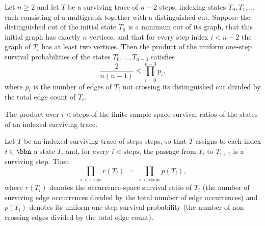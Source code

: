 \begin{theorem}
\label{KargerTrace.survivingTrace_uniform_survival_product_lower_bound}
\leanok
{}
Let $n \ge 2$ and let $T$ be a surviving trace of $n-2$ steps, indexing states $T_0,
T_1, \ldots$ each consisting of a multigraph together with a distinguished cut. Suppose
the distinguished cut of the initial state $T_0$ is a minimum cut of its graph, that
this initial graph has exactly $n$ vertices, and that for every step index $i < n-2$ the
graph of $T_i$ has at least two vertices. Then the product of the uniform one-step
survival probabilities of the states $T_0, \ldots, T_{n-3}$ satisfies \[
\frac{2}{n(n-1)} \le \prod_{i=0}^{n-3} p_i, \] where $p_i$ is the number of edges of
$T_i$ not crossing its distinguished cut divided by the total edge count of $T_i$.
\end{theorem}

\begin{definition}
\label{KargerTrace.survivingTraceEdgeChoiceSurvivalProduct}
\leanok
{}
The product over $i < \text{steps}$ of the finite sample-space survival ratios of the
states of an indexed surviving trace.
\end{definition}

\begin{lemma}
\label{KargerTrace.survivingTrace_edgeChoice_product_eq_uniform_product}
\leanok
{}
Let $T$ be an indexed surviving trace of $\text{steps}$ steps, so that $T$ assigns to
each index $i \in \bbn$ a state $T_i$ and, for every $i < \text{steps}$, the passage
from $T_i$ to $T_{i+1}$ is a surviving step. Then
\[
\prod_{i \,<\, \text{steps}} r(T_i) \;=\; \prod_{i \,<\, \text{steps}} p(T_i),
\]
where $r(T_i)$ denotes the occurrence-space survival ratio of $T_i$ (the number of
surviving edge occurrences divided by the total number of edge occurrences) and $p(T_i)$
denotes its uniform one-step survival probability (the number of non-crossing edges
divided by the total edge count).
\end{lemma}

